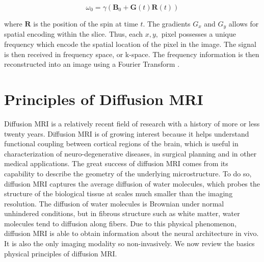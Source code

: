 \begin{equation}
\omega_{0}= \gamma (\textbf{B}_{0} + \textbf{G}(t)\textbf{R}(t))
\end{equation}

where $\textbf{R}$ is the position of the spin at time $t$. The gradients $G_{x}$ and $G_{y}$ allows for spatial encoding within the slice.  Thus, each $x,y,$ pixel possesses  a unique frequency which encode the spatial location of the pixel in the image. The signal is then received in frequency space, or k-space. The frequency information is then reconstructed into an image using a Fourier Transform \cite{liang2000principles}.

\section{Principles of Diffusion MRI}
Diffusion MRI is a relatively recent field of research with a history of more or less twenty years. Diffusion MRI is of growing interest because it helps understand functional coupling between cortical regions of the brain, which is useful in characterization of neuro-degenerative diseases, in surgical planning and in other medical applications. The great success of diffusion MRI comes from its capability to describe the geometry of the underlying microstructure. To do so, diffusion MRI captures the average diffusion of water molecules, which probes the structure of the biological tissue at scales much smaller than the imaging resolution. The diffusion of water molecules is Brownian under normal unhindered conditions, but in fibrous structure such as white matter, water molecules tend to diffusion along fibers. Due to this physical phenomenon, diffusion MRI is able to obtain information about the neural architecture in vivo. It is also the only imaging modality so non-invasively. We now review the basics physical principles of diffusion MRI.

